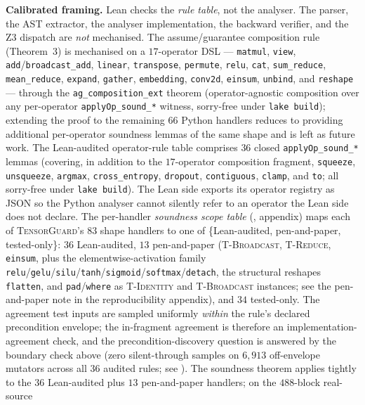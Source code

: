 \textbf{Calibrated framing.} Lean checks the \emph{rule table},
not the analyser. The parser, the AST extractor, the analyser
implementation, the backward verifier, and the Z3 dispatch are
\emph{not} mechanised. The assume/guarantee composition rule
(Theorem~3) is mechanised on a
$17$-operator DSL --- \texttt{matmul}, \texttt{view},
\texttt{add}/\texttt{broadcast\_add}, \texttt{linear},
\texttt{transpose}, \texttt{permute}, \texttt{relu},
\texttt{cat}, \texttt{sum\_reduce}, \texttt{mean\_reduce},
\texttt{expand}, \texttt{gather}, \texttt{embedding},
\texttt{conv2d}, \texttt{einsum}, \texttt{unbind}, and
\texttt{reshape} ---
through the \texttt{ag\_composition\_ext} theorem
(operator-agnostic composition over any per-operator
\texttt{applyOp\_sound\_*} witness, sorry-free under
\texttt{lake build}); extending the proof to the remaining
$66$ Python handlers reduces to providing additional per-operator
soundness lemmas of the same shape and is left as future work.
The Lean-audited operator-rule table comprises $36$ closed
\texttt{applyOp\_sound\_*} lemmas (covering, in addition to
the $17$-operator composition fragment, \texttt{squeeze},
\texttt{unsqueeze}, \texttt{argmax}, \texttt{cross\_entropy},
\texttt{dropout}, \texttt{contiguous}, \texttt{clamp}, and
\texttt{to}; all sorry-free under \texttt{lake build}). The Lean side
exports its operator registry as JSON so the Python analyser
cannot silently refer to an operator the Lean side does not
declare. The per-handler \emph{soundness scope table}
(, appendix) maps each of
\textsc{TensorGuard}'s $83$ shape handlers to one of
\{Lean-audited, pen-and-paper, tested-only\}: $36$ Lean-audited,
$13$ pen-and-paper (\textsc{T-Broadcast}, \textsc{T-Reduce},
\texttt{einsum}, plus the elementwise-activation family
\texttt{relu}/\texttt{gelu}/\texttt{silu}/\texttt{tanh}/\texttt{sigmoid}/\texttt{softmax}/\texttt{detach},
the structural reshapes \texttt{flatten},
and \texttt{pad}/\texttt{where} as
\textsc{T-Identity} and \textsc{T-Broadcast} instances; see the
pen-and-paper note in the reproducibility appendix), and $34$ tested-only.
The agreement test inputs are sampled uniformly \emph{within}
the rule's declared precondition envelope; the in-fragment
agreement is therefore an implementation-agreement check, and
the precondition-discovery question is answered by the
boundary check above (zero silent-through samples on $6{,}913$
off-envelope mutators across all $36$ audited rules; see
).
The soundness theorem applies tightly to the $36$ Lean-audited
plus $13$ pen-and-paper handlers; on the $488$-block real-source
